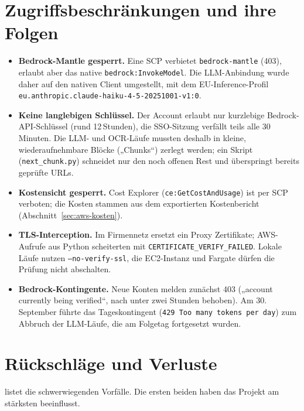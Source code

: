 \section{Zugriffsbeschränkungen und ihre Folgen}\label{sec:aws-restriktionen}
\begin{itemize}
  \item \textbf{Bedrock-Mantle gesperrt.} Eine SCP verbietet \texttt{bedrock-mantle} (403), erlaubt aber das native \texttt{bedrock:InvokeModel}. Die LLM-Anbindung wurde daher auf den nativen Client umgestellt, mit dem EU-Inference-Profil \texttt{eu.anthropic.claude-haiku-4-5-20251001-v1:0}.
  \item \textbf{Keine langlebigen Schlüssel.} Der Account erlaubt nur kurzlebige Bedrock-API-Schlüssel (rund 12\,Stunden), die SSO-Sitzung verfällt teils alle 30 Minuten. Die LLM- und OCR-Läufe mussten deshalb in kleine, wiederaufnehmbare Blöcke („Chunks“) zerlegt werden; ein Skript (\texttt{next\_chunk.py}) schneidet nur den noch offenen Rest und überspringt bereits geprüfte URLs.
  \item \textbf{Kostensicht gesperrt.} Cost Explorer (\texttt{ce:GetCostAndUsage}) ist per SCP verboten; die Kosten stammen aus dem exportierten Kostenbericht (Abschnitt~\ref{sec:aws-kosten}).
  \item \textbf{TLS-Interception.} Im Firmennetz ersetzt ein Proxy Zertifikate; AWS-Aufrufe aus Python scheiterten mit \texttt{CERTIFICATE\_VERIFY\_FAILED}. Lokale Läufe nutzen \texttt{--no-verify-ssl}, die EC2-Instanz und Fargate dürfen die Prüfung nicht abschalten.
  \item \textbf{Bedrock-Kontingente.} Neue Konten melden zunächst 403 („account currently being verified“, nach unter zwei Stunden behoben). Am 30.\,September führte das Tageskontingent (\texttt{429 Too many tokens per day}) zum Abbruch der LLM-Läufe, die am Folgetag fortgesetzt wurden.
\end{itemize}

\section{Rückschläge und Verluste}\label{sec:aws-verluste}
 listet die schwerwiegenden Vorfälle. Die ersten beiden haben das Projekt am stärksten beeinflusst.

